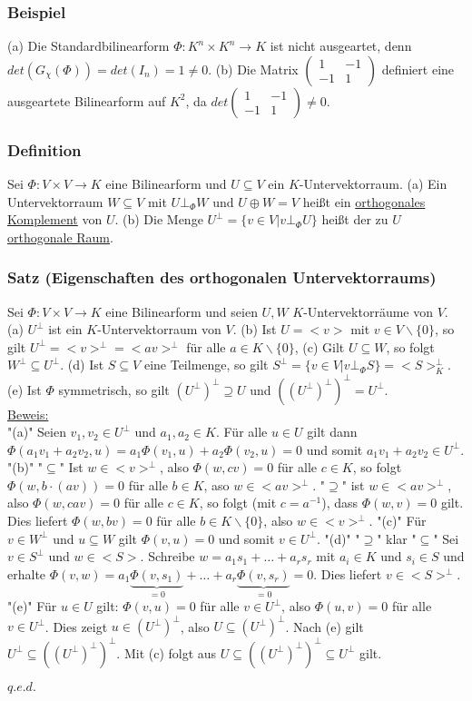 \documentclass[a4paper]{article}
\newcommand{\ul}{\underline}
\renewcommand{\proof}{\ul{Beweis:}\\}
\renewcommand{\qed}{\begin{flushright}
\ul{\(q.e.d.\)}
\end{flushright}}
\begin{document}
\subsubsection{Beispiel}
(a) Die Standardbilinearform \(\Phi:K^n\times K^n\rightarrow K\) ist nicht ausgeartet, denn \(det(G_\chi(\Phi))=det(I_n)=1\neq 0\).
(b) Die Matrix \(\begin{pmatrix}
	1 & -1\\
	-1 & 1
\end{pmatrix}\) definiert eine ausgeartete Bilinearform auf \(K^2\), da \(det\begin{pmatrix}
1 & -1\\
-1 & 1
\end{pmatrix}\neq 0\).
\subsubsection{Definition}
Sei \(\Phi:V\times V\rightarrow K\) eine Bilinearform und \(U\subseteq V\) ein \(K\)-Untervektorraum.
(a) Ein Untervektorraum \(W\subseteq V\) mit \(U\bot_\Phi W\) und \(U\oplus W=V\) heißt ein \ul{orthogonales Komplement} von \(U\).
(b) Die Menge \(U^\bot=\{v\in V|v\bot_\Phi U\}\) heißt der zu \(U\) \ul{orthogonale Raum}.
\subsubsection{Satz (Eigenschaften des orthogonalen Untervektorraums)}
Sei \(\Phi:V\times V\rightarrow K\) eine Bilinearform und seien \(U,W\) \(K\)-Untervektorräume von \(V\).
(a) \(U^\bot\) ist ein \(K\)-Untervektorraum von \(V\).
(b) Ist \(U=<v>\) mit \(v\in V\backslash\{0\}\), so gilt \(U^\bot=<v>^\bot=<av>^\bot\) für alle \(a\in K\backslash\{0\}\),
(c) Gilt \(U\subseteq W\), so folgt \(W^\bot\subseteq U^\bot\).
(d) Ist \(S\subseteq V\) eine Teilmenge, so gilt \(S^\bot=\{v\in V|v\bot_\Phi S\}=<S>_K^\bot\).
(e) Ist \(\Phi\) symmetrisch, so gilt \((U^\bot)^\bot\supseteq U\) und \(((U^\bot)^\bot)^\bot=U^\bot\).\\
\proof
"(a)" Seien \(v_1,v_2\in U^\bot\) und \(a_1,a_2\in K\). Für alle \(u\in U\) gilt dann \(\Phi(a_1v_1+a_2v_2,u)=a_1\Phi(v_1,u)+a_2\Phi(v_2,u)=0\) und somit \(a_1v_1+a_2v_2\in U^\bot\).
"(b)" "\(\subseteq\)" Ist \(w\in<v>^\bot\), also \(\Phi(w,cv)=0\) für alle \(c\in K\), so folgt \(\Phi(w,b\cdot (av))=0\) für alle \(b\in K\), aso \(w\in<av>^\bot\).
"\(\supseteq\)" ist \(w\in<av>^\bot\), also \(\Phi(w,cav)=0\) für alle \(c\in K\), so folgt (mit \(c=a^{-1}\)), dass \(\Phi(w,v)=0\) gilt. Dies liefert \(\Phi(w,bv)=0\) für alle \(b\in K\backslash\{0\}\), also \(w\in<v>^\bot\).
"(c)" Für \(v\in W^\bot\) und \(u\subseteq W\) gilt \(\Phi(v,u)=0\) und somit \(v\in U^\bot\).
"(d)" "\(\supseteq\)" klar "\(\subseteq\)" Sei \(v\in S^\bot\) und \(w\in<S>\). Schreibe \(w=a_1s_1+\dots+a_rs_r\) mit \(a_i\in K\) und \(s_i\in S\) und erhalte \(\Phi(v,w)=a_1\underbrace{\Phi(v,s_1)}_{=0}+\dots+a_r\underbrace{\Phi(v,s_r)}_{=0}=0\). Dies liefert \(v\in<S>^\bot\).
"(e)" Für \(u\in U\) gilt: \(\Phi(v,u)=0\) für alle \(v\in U^\bot\), also \(\Phi(u,v)=0\) für alle \(v\in U^\bot\). Dies zeigt \(u\in(U^\bot)^\bot\), also \(U\subseteq(U^\bot)^\bot\). Nach (e) gilt \(U^\bot\subseteq ((U^\bot)^\bot)^\bot\). Mit (c) folgt aus \(U\subseteq ((U^\bot)^\bot)^\bot\subseteq U^\bot\) gilt.
\qed
\end{document}
